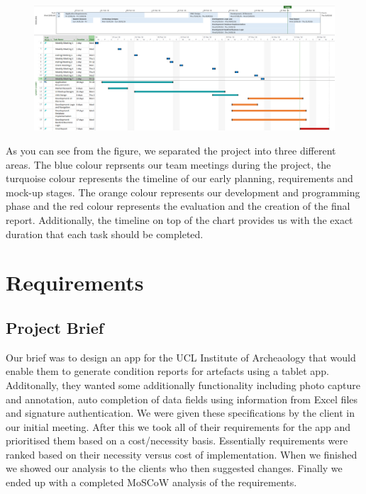 \documentclass[12pt]{article}
\begin{document}
\begin{figure}[h]
\begin{center}
\includegraphics[width=1.0\textwidth]{ArcheoReportGantt}
\end{center}
\end{figure}

As you can see from the figure, we separated the project into three different areas. The blue colour reprsents our team meetings during the project, the turquoise colour represents the timeline of our early planning, requirements and mock-up stages. The orange colour represents our development and programming phase and the red colour represents the evaluation and the creation of the final report. Additionally, the timeline on top of the chart provides us with the exact duration that each task should be completed. 

\section{Requirements}
\subsection{Project Brief}
Our brief was to design an app for the UCL Institute of Archeaology that would enable them to generate condition reports for artefacts using a tablet app. Additonally, they wanted some additionally functionality including photo capture and annotation, auto completion of data fields using information from Excel files and signature authentication. We were given these specifications by the client in our initial meeting. After this we took all of their requirements for the app and prioritised them based on a cost/necessity basis. Essentially requirements were ranked based on their necessity versus cost of implementation. When we finished we showed our analysis to the clients who then suggested changes. Finally we ended up with a completed MoSCoW analysis of the requirements.
\end{document}

